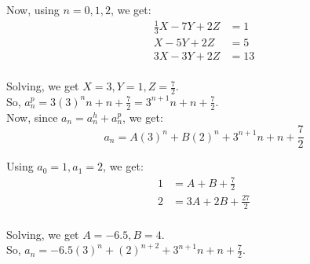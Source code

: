 \documentclass[a4paper]{article}
\begin{document}
\begin{enumerate}
\begin{enumerate}
            Now, using $n = 0, 1, 2$, we get:
            \[
                \begin{split}
                    \frac{1}{3}X - 7Y + 2Z &= 1 \\
                    X - 5Y + 2Z &= 5 \\
                    3X - 3Y + 2Z &= 13 \\
                \end{split}
            \]

            Solving, we get $X = 3, Y = 1, Z = \frac{7}{2}$. \\
            So, $a^p_n = 3(3)^nn + n + \frac{7}{2} = 3^{n+1}n + n + \frac{7}{2}$. \\

            Now, since $a_n = a^h_n + a^p_n$, we get:
            \[ a_n = A(3)^n + B(2)^n + 3^{n+1}n + n + \frac{7}{2} \]

            Using $a_0 = 1, a_1 = 2$, we get:
            \[
                \begin{split}
                    1 &= A + B + \frac{7}{2} \\
                    2 &= 3A + 2B + \frac{27}{2} \\
                \end{split}
            \]
            
            Solving, we get $A = -6.5, B = 4$. \\

            So, $a_n = -6.5(3)^n + (2)^{n+2} + 3^{n+1}n + n + \frac{7}{2}$. \\
        \end{enumerate}

        

    \end{enumerate}

\newpage
\end{document}
